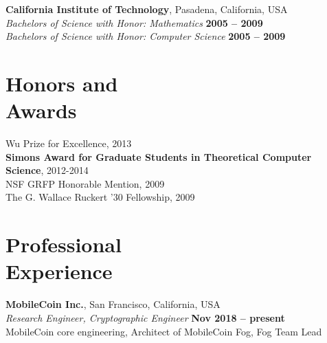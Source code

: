 \documentclass[margin,line]{resume}
\begin{document}
\begin{resume}
    \textbf{California Institute of Technology}, Pasadena, California, USA \vspace{2mm}\\\vspace{1mm}%
    \textsl{Bachelors of Science with Honor: Mathematics} \hfill \textbf{ 2005 -- 2009}\\
    \textsl{Bachelors of Science with Honor: Computer Science} \hfill \textbf{ 2005 -- 2009}\vspace{-3mm}\\%

    \section{\mysidestyle Honors and\\Awards} 

    Wu Prize for Excellence, 2013 \vspace{1mm}\\
    {\bf Simons Award for Graduate Students in Theoretical Computer Science}, 2012-2014		    \vspace{1mm}\\
    NSF GRFP Honorable Mention, 2009								    \vspace{1mm}\\%
    The G. Wallace Ruckert '30 Fellowship, 2009 						    \vspace{1mm}\\%

    \section{\mysidestyle Professional\\Experience}

    \textbf{MobileCoin Inc.}, San Francisco, California, USA \vspace{2mm}\\\vspace{1mm}%
    \textsl{Research Engineer, Cryptographic Engineer} \hfill \textbf{Nov 2018 -- present}\\
    MobileCoin core engineering, Architect of MobileCoin Fog, Fog Team Lead


\end{resume}
\end{document}
